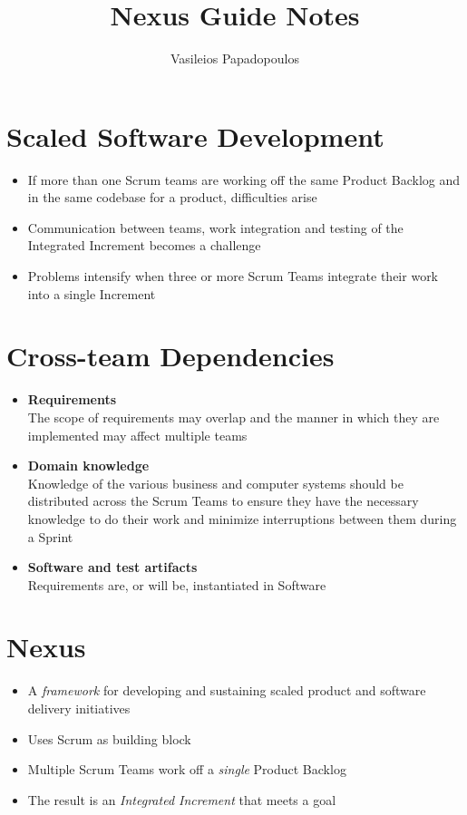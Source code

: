 \documentclass[a4paper,11pt,twocolumn]{article}
\title{\textbf{Nexus Guide Notes} \vspace{-2ex}}
\author{Vasileios Papadopoulos}
\date{}
\begin{document}
\maketitle

\thispagestyle{fancy}

\section*{Scaled Software Development}
\begin{itemize}
	\item If more than one Scrum teams are working off the same Product Backlog and in the same codebase for a product, difficulties arise
	\item Communication between teams, work integration and testing of the Integrated Increment becomes a challenge
	\item Problems intensify when three or more Scrum Teams integrate their work into a single Increment
\end{itemize}

\section*{Cross-team Dependencies}
\begin{itemize}
	\item \textbf{Requirements}\\
	The scope of requirements may overlap and the manner in which they are implemented may affect multiple teams
	\item \textbf{Domain knowledge}\\
	Knowledge of the various business and computer systems should be distributed across the Scrum Teams to ensure they have the necessary knowledge to do their work and minimize interruptions between them during a Sprint
	\item \textbf{Software and test artifacts}\\
	Requirements are, or will be, instantiated in Software
\end{itemize}

\section*{Nexus}
\begin{itemize}
    \item A \textit{framework} for developing and sustaining scaled product and software delivery initiatives
	\item Uses Scrum as building block
	\item Multiple Scrum Teams work off a \textit{single} Product Backlog
	\item The result is an \textit{Integrated Increment} that meets a goal
\end{itemize}
\end{document}
